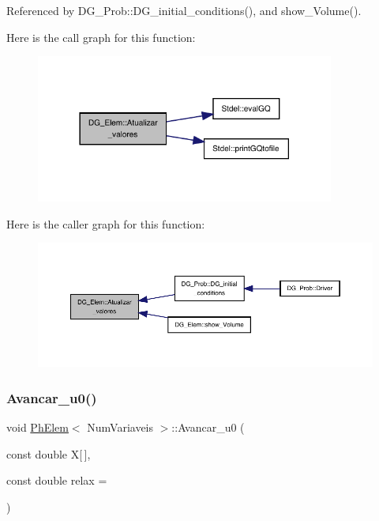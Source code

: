 Referenced by D\+G\+\_\+\+Prob\+::\+D\+G\+\_\+initial\+\_\+conditions(), and show\+\_\+\+Volume().

Here is the call graph for this function\+:
\nopagebreak
\begin{figure}[H]
\begin{center}
\leavevmode
\includegraphics[width=278pt]{classDG__Elem_a70dbc366e1cdfb0b96fa9d640dcff689_cgraph}
\end{center}
\end{figure}
Here is the caller graph for this function\+:
\nopagebreak
\begin{figure}[H]
\begin{center}
\leavevmode
\includegraphics[width=350pt]{classDG__Elem_a70dbc366e1cdfb0b96fa9d640dcff689_icgraph}
\end{center}
\end{figure}
\mbox{\label{classPhElem_a7dc16c86382b340e9d1c5983eb478cee}} 
\subsubsection{\texorpdfstring{Avancar\+\_\+u0()}{Avancar\_u0()}}
{\footnotesize\ttfamily void \hyperlink{classPhElem}{Ph\+Elem}$<$ Num\+Variaveis $>$\+::Avancar\+\_\+u0 (\begin{DoxyParamCaption}\item[{const double}]{X\mbox{[}$\,$\mbox{]},  }\item[{const double}]{relax = {} }\end{DoxyParamCaption})\hspace{0.3cm}{\ttfamily [inherited]}}



